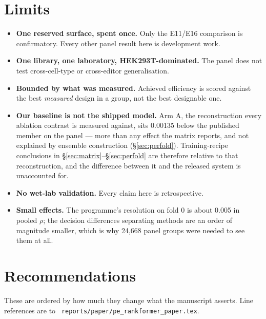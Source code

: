 \documentclass[11pt]{article}
\newcommand{\code}[1]{\texttt{\small\begingroup\hyphenpenalty=10000 #1\endgroup}}
\begin{document}
\section{Limits}

\begin{itemize}\itemsep3pt
\item \textbf{One reserved surface, spent once.} Only the E11/E16 comparison is confirmatory.
Every other panel result here is development work.
\item \textbf{One library, one laboratory, HEK293T-dominated.} The panel does not test
cross-cell-type or cross-editor generalisation.
\item \textbf{Bounded by what was measured.} Achieved efficiency is scored against the best
\emph{measured} design in a group, not the best designable one.
\item \textbf{Our baseline is not the shipped model.} Arm A, the reconstruction every
ablation contrast is measured against, sits 0.00135 below the published member on the panel
--- more than any effect the matrix reports, and not explained by ensemble construction
(\S\ref{sec:perfold}). Training-recipe conclusions in \S\ref{sec:matrix}--\S\ref{sec:perfold}
are therefore relative to that reconstruction, and the difference between it and the released
system is unaccounted for.

\item \textbf{No wet-lab validation.} Every claim here is retrospective.
\item \textbf{Small effects.} The programme's resolution on fold 0 is about 0.005 in pooled
$\rho$; the decision differences separating methods are an order of magnitude smaller, which
is why 24{,}668 panel groups were needed to see them at all.
\end{itemize}

\section{Recommendations}

These are ordered by how much they change what the manuscript asserts. Line references are to
\code{reports/paper/pe\_rankformer\_paper.tex}.
\end{document}
